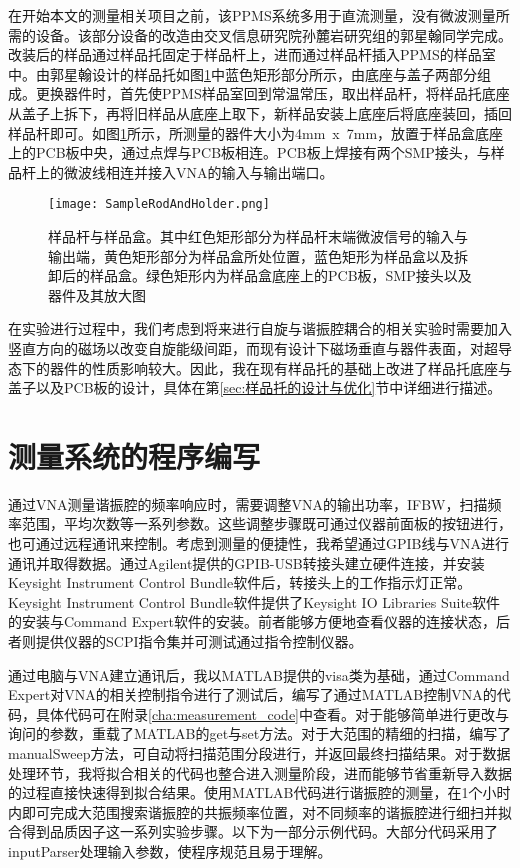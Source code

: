             在开始本文的测量相关项目之前，该PPMS系统多用于直流测量，没有微波测量所需的设备。该部分设备的改造由交叉信息研究院孙麓岩研究组的郭星翰同学完成。改装后的样品通过样品托固定于样品杆上，进而通过样品杆插入PPMS的样品室中。由郭星翰设计的样品托如图\ref{fig:samplerodHolder}中蓝色矩形部分所示，由底座与盖子两部分组成。更换器件时，首先使PPMS样品室回到常温常压，取出样品杆，将样品托底座从盖子上拆下，再将旧样品从底座上取下，新样品安装上底座后将底座装回，插回样品杆即可。如图\ref{fig:samplerodHolder}所示，所测量的器件大小为4mm~x~7mm，放置于样品盒底座上的PCB板中央，通过点焊与PCB板相连。PCB板上焊接有两个SMP接头，与样品杆上的微波线相连并接入VNA的输入与输出端口。


\begin{figure}[h]
  \centering%
  \texttt{[image: SampleRodAndHolder.png]}
  \caption{样品杆与样品盒。其中红色矩形部分为样品杆末端微波信号的输入与输出端，黄色矩形部分为样品盒所处位置，蓝色矩形为样品盒以及拆卸后的样品盒。绿色矩形内为样品盒底座上的PCB板，SMP接头以及器件及其放大图}
  \label{fig:samplerodHolder}
\end{figure}

            在实验进行过程中，我们考虑到将来进行自旋与谐振腔耦合的相关实验时需要加入竖直方向的磁场以改变自旋能级间距，而现有设计下磁场垂直与器件表面，对超导态下的器件的性质影响较大。因此，我在现有样品托的基础上改进了样品托底座与盖子以及PCB板的设计，具体在第\ref{sec:样品托的设计与优化}节中详细进行描述。
                

            \section{测量系统的程序编写} %
            \label{sec:测量系统}
            通过VNA测量谐振腔的频率响应时，需要调整VNA的输出功率，IFBW，扫描频率范围，平均次数等一系列参数。这些调整步骤既可通过仪器前面板的按钮进行，也可通过远程通讯来控制。考虑到测量的便捷性，我希望通过GPIB线与VNA进行通讯并取得数据。通过Agilent提供的GPIB-USB转接头建立硬件连接，并安装Keysight Instrument Control Bundle软件后，转接头上的工作指示灯正常。Keysight Instrument Control Bundle软件提供了Keysight IO Libraries Suite软件的安装与Command Expert软件的安装。前者能够方便地查看仪器的连接状态，后者则提供仪器的SCPI指令集并可测试通过指令控制仪器。

            通过电脑与VNA建立通讯后，我以MATLAB提供的visa类为基础，通过Command Expert对VNA的相关控制指令进行了测试后，编写了通过MATLAB控制VNA的代码，具体代码可在附录\ref{cha:measurement_code}中查看。对于能够简单进行更改与询问的参数，重载了MATLAB的get与set方法。对于大范围的精细的扫描，编写了manualSweep方法，可自动将扫描范围分段进行，并返回最终扫描结果。对于数据处理环节，我将拟合相关的代码也整合进入测量阶段，进而能够节省重新导入数据的过程直接快速得到拟合结果。使用MATLAB代码进行谐振腔的测量，在1个小时内即可完成大范围搜索谐振腔的共振频率位置，对不同频率的谐振腔进行细扫并拟合得到品质因子这一系列实验步骤。以下为一部分示例代码。大部分代码采用了inputParser处理输入参数，使程序规范且易于理解。

